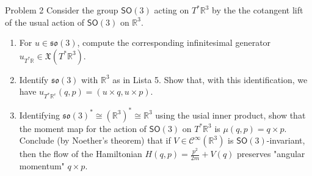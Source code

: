 \begin{thing1}{Problem 2}\leavevmode
Consider the group $\mathsf{SO}(3)$ acting on $T^*\mathbb{R}^{3}$ by the the cotangent lift of the usual action of $\mathsf{SO}(3)$ on $\mathbb{R}^{3}$.
\begin{enumerate}[label=\alph*.]
\item For $u\in\mathfrak{so}(3)$, compute the corresponding infinitesimal generator $u_{T^*\mathbb{R}}\in\mathfrak{X}(T^*\mathbb{R}^{3})$.
\item Identify $\mathfrak{so}(3)$ with $\mathbb{R}^3$ as in Lista 5. Show that, with this identification, we have $u_{T^*\mathbb{R}^e}(q,p)=(u\times q,u\times p)$.
\item Identifying $\mathfrak{so}(3)^*\cong(\mathbb{R}^{3})^*\cong\mathbb{R}^{3}$ using the usial inner product, show that the moment map for the action of $\mathsf{SO}(3)$ on $T^*\mathbb{R}^{3}$ is $\mu(q,p)=q\times p$. Conclude (by Noether's theorem) that if $V\in \mathcal{C}^\infty(\mathbb{R}^3)$ is $\mathsf{SO}(3)$-invariant, then the flow of the Hamiltonian $H(q,p)=\frac{p^2}{2m}+V(q)$ preserves "angular momentum" $q \times p$.
\end{enumerate}
\end{thing1}

